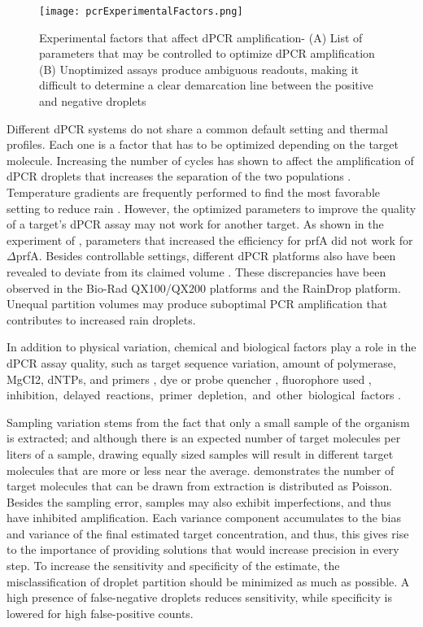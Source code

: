 \begin{figure}[h]
    \centering
    \texttt{[image: pcrExperimentalFactors.png]}
    \caption[Experimental factors that affect dPCR amplification]%
    {Experimental factors that affect dPCR amplification- (A) List of parameters that may be controlled to optimize dPCR amplification (B) Unoptimized assays produce ambiguous readouts, making it difficult to determine a clear demarcation line between the positive and negative droplets }
        \label{fig:pcrExperimentalFactors}
\end{figure}

Different dPCR systems do not share a common default setting and thermal profiles. Each one is a factor that has to be optimized depending on the target molecule. Increasing the number of cycles has shown to affect the amplification of dPCR droplets that increases the separation of the two populations \cite{Koppel2015}. Temperature gradients are frequently performed to find the most favorable setting to reduce rain \cite{Gerdes2016}. However, the optimized parameters to improve the quality of a target's dPCR assay may not work for another target. As shown in the experiment of , parameters that increased the efficiency for prfA did not work for \(\Delta\)prfA. Besides controllable settings, different dPCR platforms also have been revealed to deviate from its claimed volume \cite{Pinheiro2012,Dong2015,Corbisier2015,Dagata2016,Kosir2017}. These discrepancies have been observed in the Bio-Rad QX100/QX200 platforms and the RainDrop platform. Unequal partition volumes may produce suboptimal PCR amplification that contributes to increased rain droplets.

In addition to physical variation, chemical and biological factors play a role in the dPCR assay quality, such as target sequence variation, amount of polymerase, MgCI2, dNTPs, and primers \cite{Koppel2015, Kramer2001}, dye or probe quencher \cite{Witte2016}, fluorophore used \cite{Gerdes2016}, inhibition, delayed reactions, primer depletion, and other biological factors \cite{Jacobs2014}.

Sampling variation stems from the fact that only a small sample of the organism is extracted; and although there is an expected number of target molecules per liters of a sample, drawing equally sized samples will result in different target molecules that are more or less near the average.  demonstrates the number of target molecules that can be drawn from extraction is distributed as Poisson. Besides the sampling error, samples may also exhibit imperfections, and thus have inhibited amplification. Each variance component accumulates to the bias and variance of the final estimated target concentration, and thus, this gives rise to the importance of providing solutions that would increase precision in every step. To increase the sensitivity and specificity of the estimate, the misclassification of droplet partition should be minimized as much as possible. A high presence of false-negative droplets reduces sensitivity, while specificity is lowered for high false-positive counts. 

